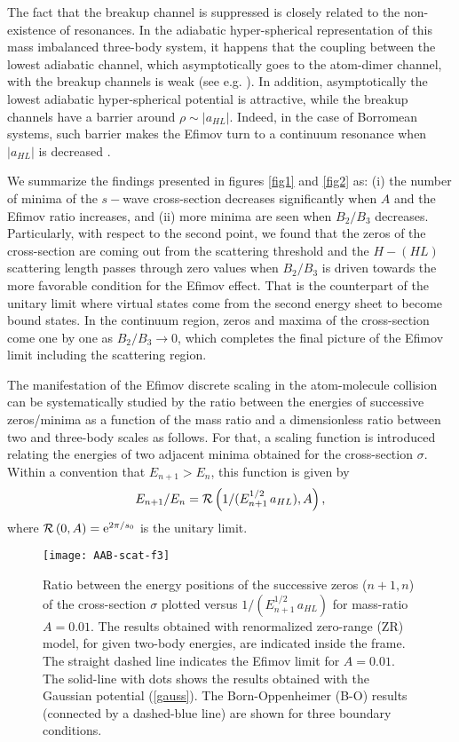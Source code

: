 \documentclass[twocolumn,amsmath,amssymb,epsfig,aps,prl]{revtex4}
\begin{document}
The fact that the breakup channel is suppressed is closely related to the non-existence of resonances. 
In the adiabatic hyper-spherical representation of this mass imbalanced three-body system, it happens that
the coupling between the lowest adiabatic channel, which asymptotically goes to the
atom-dimer channel, with the breakup channels is weak (see e.g. \cite{2012GarridoPRA86}). 
In addition,  asymptotically the lowest
adiabatic hyper-spherical potential is attractive, while the breakup channels have a barrier around
$\rho\sim |a_{HL}|$. Indeed, in the case of Borromean systems, such barrier makes the Efimov turn to a 
continuum resonance when  $|a_{HL}|$ is decreased \cite{BringasPRA04}.
 	
 We summarize the findings presented in figures \ref{fig1} and \ref{fig2} as: 
 (i) the number of minima of  the $s-$wave cross-section decreases significantly when $A$ and 
 the Efimov ratio increases, and (ii) more minima are seen when  $B_2/B_3$ decreases. Particularly, with respect to 
 the second point, we found that the zeros of the cross-section are coming out from the scattering threshold and the
 $H-(HL)$ scattering length passes through zero values  
 when  $B_2/B_3$ is driven towards the more favorable condition for the  Efimov effect. 
 That is the counterpart of the unitary limit where virtual states come from the second energy sheet 
 to become bound states. In the continuum region, zeros and maxima of the cross-section come one by one as
$B_2/{ B}_3\to 0$, which completes the final picture of the Efimov limit including the scattering region. 

The manifestation of the Efimov discrete scaling in the atom-molecule collision can be
systematically studied by the ratio between the energies of successive zeros/minima as a function of the mass ratio and
a dimensionless ratio between two and three-body scales as follows.
For that, a scaling function is introduced relating the energies of two adjacent minima obtained for the 
cross-section $\sigma$. Within a convention that $E_{n+1}>E_n$, this function is given by
\begin{equation}\label{ratio}
E_{n+1}/E_n={\cal R}\left( 1/(E_{n+1}^ {1/2}\, a_{HL}), A \right),
\end{equation} 
where ${\cal R}\left( 0, A\right)=\text{e}^{2\pi/s_0}$ is the unitary limit.

\begin{figure}[thb]
\begin{center}
\texttt{[image: AAB-scat-f3]}
\end{center}
\caption{Ratio between the energy positions of  the successive zeros ($n+1, n$) of the cross-section $\sigma$  plotted versus 
$1/(E_{n+1}^{1/2}\, a_{HL})$ for mass-ratio $A=0.01$. 
The results obtained with renormalized zero-range (ZR) model, for given two-body energies, are indicated inside the frame.
The straight dashed line indicates the Efimov limit for $A=0.01$.
The solid-line with dots shows the results obtained with the Gaussian potential (\ref{gauss}).
The Born-Oppenheimer (B-O) results (connected by a dashed-blue line) are shown for three boundary
conditions. 
}
\label{fig3}\end{figure}
\end{document}
